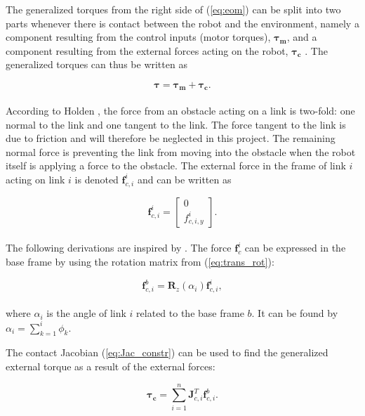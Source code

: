 The generalized torques from the right side of (\ref{eq:eom}) can be split into two parts whenever there is contact between the robot and the environment, namely a component resulting from the control inputs (motor torques), $\boldsymbol{\tau_{m}}$, and a component resulting from the external forces acting on the robot, $\boldsymbol{\tau_{c}}$ \cite{rezapour2014path}. The generalized torques can thus be written as

\begin{equation}
    \boldsymbol{\tau} = \boldsymbol{\tau_{m}} + \boldsymbol{\tau_{c}}.
\end{equation}
\\
According to Holden \cite{holden2014optimal}, the force from an obstacle acting on a link is two-fold: one normal to the link and one tangent to the link. The force tangent to the link is due to friction and will therefore be neglected in this project. The remaining normal force is preventing the link from moving into the obstacle when the robot itself is applying a force to the obstacle. The external force in the frame of link $i$ acting on link $i$ is denoted $\mathbf{f}^i_{c,i}$ and can be written as

\begin{equation}
    \mathbf{f}^i_{c,i}=
    \begin{bmatrix}
        0 \\
        f^i_{c,i,y}
    \end{bmatrix}.
\end{equation}
\\
The following derivations are inspired by \cite{rezapour2014path}. The force $\mathbf{f}^i_c$ can be expressed in the base frame by using the rotation matrix from (\ref{eq:trans_rot}):

\begin{equation}
    \mathbf{f}^b_{c,i} = \mathbf{R}_z(\alpha_i) \mathbf{f}^i_{c,i},
\end{equation}
\\
where $\alpha_i$ is the angle of link $i$ related to the base frame $b$. It can be found by $\alpha_i = \sum_{k=1}^{i} \phi_k$.

The contact Jacobian (\ref{eq:Jac_constr}) can be used to find the generalized external torque as a result of the external forces:

\begin{equation}
    \boldsymbol{\tau_c} = \sum_{i=1}^{n} \mathbf{J}^T_{c,i} \mathbf{f}^b_{c,i}.
\end{equation}



